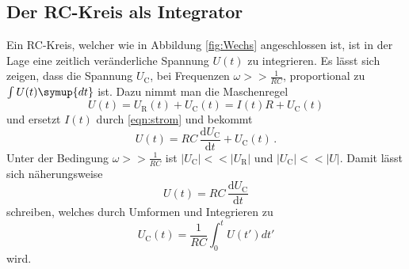\subsection{Der RC-Kreis als Integrator}
Ein RC-Kreis, welcher wie in Abbildung \ref{fig:Wechs} angeschlossen ist, ist in der Lage eine zeitlich veränderliche Spannung $U(t)$ zu integrieren.
Es lässt sich zeigen, dass die Spannung $U_\text{C}$, bei Frequenzen $\omega >> \frac{1}{RC}$, proportional zu $\int U(t) \symup{dt}$ ist.
Dazu nimmt man die Maschenregel
\begin{equation}
    U(t)=U_\text{R}(t)+U_\text{C}(t) =I(t)R +U_\text{C}(t)
\end{equation}
und ersetzt $I(t)$ durch \eqref{eqn:strom} und bekommt
\begin{equation*}
    U(t)=RC\, \frac{\text{d}U_\text{C}}{\text{d}t} + U_\text{C}(t) \, .
\end{equation*}
Unter der Bedingung $\omega >> \frac{1}{RC}$ ist $|U_\text{C}| << |U_\text{R}|$ und $|U_\text{C}| << |U|$. 
Damit lässt sich näherungsweise 
\begin{equation*}
    U(t)=RC \, \frac{\text{d}U_\text{C}}{\text{d}t}
\end{equation*}
schreiben, welches durch Umformen und Integrieren zu
\begin{equation}
    U_\text{C}(t)=\frac{1}{RC} \int_0^t U(t') dt'
\end{equation}
wird.